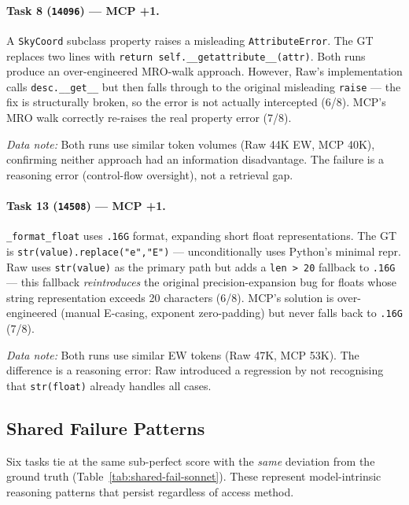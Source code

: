 \paragraph{Task 8 (\texttt{14096}) --- MCP +1.}
A \texttt{SkyCoord} subclass property raises a misleading
\texttt{AttributeError}.
The GT replaces two lines with
\texttt{return self.\_\_getattribute\_\_(attr)}.
Both runs produce an over-engineered MRO-walk approach.
However, Raw's implementation calls \texttt{desc.\_\_get\_\_} but
then falls through to the original misleading \texttt{raise} --- the
fix is structurally broken, so the error is not actually intercepted
(6/8).
MCP's MRO walk correctly re-raises the real property error (7/8).

\emph{Data note:} Both runs use similar token volumes (Raw 44K EW,
MCP 40K), confirming neither approach had an information disadvantage.
The failure is a reasoning error (control-flow oversight), not a
retrieval gap.

\paragraph{Task 13 (\texttt{14508}) --- MCP +1.}
\texttt{\_format\_float} uses \texttt{.16G} format, expanding
short float representations.
The GT is \texttt{str(value).replace("e","E")} --- unconditionally
uses Python's minimal repr.
Raw uses \texttt{str(value)} as the primary path but adds a
\texttt{len~>~20} fallback to \texttt{.16G} --- this fallback
\emph{reintroduces} the original precision-expansion bug for floats
whose string representation exceeds 20 characters (6/8).
MCP's solution is over-engineered (manual E-casing, exponent
zero-padding) but never falls back to \texttt{.16G} (7/8).

\emph{Data note:} Both runs use similar EW tokens (Raw 47K, MCP 53K).
The difference is a reasoning error: Raw introduced a regression by
not recognising that \texttt{str(float)} already handles all cases.

\subsection{Shared Failure Patterns}\label{sec:shared-sonnet}

Six tasks tie at the same sub-perfect score with the \emph{same}
deviation from the ground truth
(Table~\ref{tab:shared-fail-sonnet}).
These represent model-intrinsic reasoning patterns that persist
regardless of access method.

